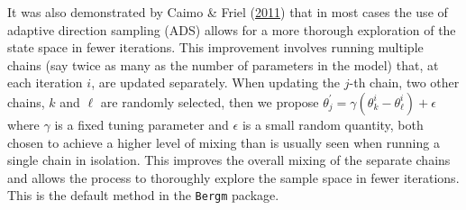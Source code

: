 \documentclass[12pt,twoside]{reedthesis}
\theoremstyle{definition}
\theoremstyle{definition}
\theoremstyle{remark}
\begin{document}
It was also demonstrated by Caimo \& Friel
(\protect\hyperlink{ref-Caimo2011}{2011}) that in most cases the use of
adaptive direction sampling (ADS) allows for a more thorough exploration
of the state space in fewer iterations. This improvement involves
running multiple chains (say twice as many as the number of parameters
in the model) that, at each iteration \(i\), are updated separately.
When updating the \(j\)-th chain, two other chains, \(k\) and \(\ell\)
are randomly selected, then we propose
\(\theta_{j}^{\prime} = \gamma (\theta^{i}_{k} - \theta^{i}_{\ell}) + \epsilon\)
where \(\gamma\) is a fixed tuning parameter and \(\epsilon\) is a small
random quantity, both chosen to achieve a higher level of mixing than is
usually seen when running a single chain in isolation. This improves the
overall mixing of the separate chains and allows the process to
thoroughly explore the sample space in fewer iterations. This is the
default method in the \texttt{Bergm} package.
\end{document}
